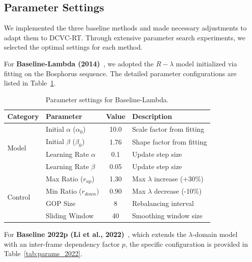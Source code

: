 \subsection{Parameter Settings}

We implemented the three baseline methods and made necessary adjustments to adapt them to DCVC-RT. Through extensive parameter search experiments, we selected the optimal settings for each method.

For \textbf{Baseline-Lambda (2014)}~\cite{50}, we adopted the $R-\lambda$ model initialized via fitting on the Bosphorus sequence. The detailed parameter configurations are listed in Table~\ref{tab:params_2014}.

\begin{table}[ht]
\centering
\caption{Parameter settings for Baseline-Lambda.}
\label{tab:params_2014}
\begin{tabular}{@{}llcl@{}}
\toprule
\textbf{Category} & \textbf{Parameter} & \textbf{Value} & \textbf{Description} \\ \midrule
\multirow{4}{*}{Model} 
 & Initial $\alpha$ ($\alpha_0$) & 10.0 & Scale factor from fitting \\
 & Initial $\beta$ ($\beta_0$) & 1.76 & Shape factor from fitting \\
 & Learning Rate $\alpha$ & 0.1 & Update step size \\
 & Learning Rate $\beta$ & 0.05 & Update step size \\ \midrule
\multirow{4}{*}{Control} 
 & Max Ratio ($r_{up}$) & 1.30 & Max $\lambda$ increase (+30\%) \\
 & Min Ratio ($r_{down}$) & 0.90 & Max $\lambda$ decrease (-10\%) \\
 & GOP Size & 8 & Rebalancing interval \\
 & Sliding Window & 40 & Smoothing window size \\ \bottomrule
\end{tabular}
\end{table}

For \textbf{Baseline 2022p (Li et al., 2022)}~\cite{51}, which extends the $\lambda$-domain model with an inter-frame dependency factor $p$, the specific configuration is provided in Table~\ref{tab:params_2022}.

